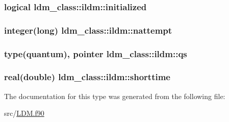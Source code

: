 \hypertarget{structldm__class_1_1ildm_a11801eac8d58dc9fd957c5571ce5e70f}{
\subsubsection[{initialized}]{\setlength{\rightskip}{0pt plus 5cm}logical ldm\+\_\+class\+::ildm\+::initialized\hspace{0.3cm}{\ttfamily [private]}}}\label{structldm__class_1_1ildm_a11801eac8d58dc9fd957c5571ce5e70f}
\hypertarget{structldm__class_1_1ildm_aa96800511a6cd823153cc5aba5d5f556}{
\subsubsection[{nattempt}]{\setlength{\rightskip}{0pt plus 5cm}integer(long) ldm\+\_\+class\+::ildm\+::nattempt\hspace{0.3cm}{\ttfamily [private]}}}\label{structldm__class_1_1ildm_aa96800511a6cd823153cc5aba5d5f556}
\hypertarget{structldm__class_1_1ildm_a32b4a75ab3169c6ebc44f889955c87f9}{
\subsubsection[{qs}]{\setlength{\rightskip}{0pt plus 5cm}type(quantum), pointer ldm\+\_\+class\+::ildm\+::qs\hspace{0.3cm}{\ttfamily [private]}}}\label{structldm__class_1_1ildm_a32b4a75ab3169c6ebc44f889955c87f9}
\hypertarget{structldm__class_1_1ildm_af581a7e8d199abfdab3ac80bcec97433}{
\subsubsection[{shorttime}]{\setlength{\rightskip}{0pt plus 5cm}real(double) ldm\+\_\+class\+::ildm\+::shorttime\hspace{0.3cm}{\ttfamily [private]}}}\label{structldm__class_1_1ildm_af581a7e8d199abfdab3ac80bcec97433}


The documentation for this type was generated from the following file\+:\begin{DoxyCompactItemize}
\item 
src/\hyperlink{_l_d_m_8f90}{L\+D\+M.\+f90}\end{DoxyCompactItemize}
